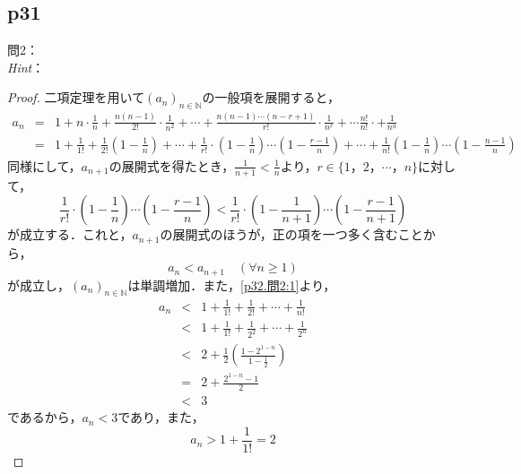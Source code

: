 \documentclass[dvipdfmx,uplatex,11pt]{jsarticle}
\begin{document}
\subsection{p31}
\noindent
問2：
\\
\textsl{Hint}：\\
\dotfill
\begin{leftbar}
	\begin{proof}
		二項定理を用いて$(a_n)_{n \in \mathbb{N}}$の一般項を展開すると，
		\begin{eqnarray}
			a_n & = & 1 + n \cdot \frac{1}{n} + \frac{n(n-1)}{2!} \cdot \frac{1}{n^2} + \cdots + \frac{n(n-1)\cdots(n-r+1)}{r!} \cdot \frac{1}{n^r} + \cdots \frac{n!}{n!} \cdot + \frac{1}{n^n} \nonumber  \\
			& = & 1+ \frac{1}{1!} + \frac{1}{2!} \left(1- \frac{1}{n} \right) + \cdots + \frac{1}{r!} \cdot  \left(1 - \frac{1}{n} \right) \cdots \left (1-\frac{r-1}{n} \right) + \cdots \nonumber +  \frac{1}{n!} \left(1 - \frac{1}{n} \right) \cdots \left(1- \frac{n-1}{n} \right) \label{p32.問2:1}
		\end{eqnarray}
		同様にして，$a_{n+1}$の展開式を得たとき，$ \frac{1}{n+1} < \frac{1}{n}$より，$r\in \{ 1，2，\cdots ，n\}$に対して，
		\begin{equation}
			\frac{1}{r!} \cdot  \left(1 - \frac{1}{n} \right) \cdots \left (1-\frac{r-1}{n} \right) < \frac{1}{r!} \cdot  \left(1 - \frac{1}{n+1} \right) \cdots \left (1-\frac{r-1}{n+1} \right)
		\end{equation}
		が成立する．これと，$a_{n+1}$の展開式のほうが，正の項を一つ多く含むことから，
		\begin{equation}
			a_{n} < a_{n+1} \quad (\forall n \ge 1)
		\end{equation}
		が成立し，$(a_n)_{n \in \mathbb{N}}$は単調増加．また，\eqref{p32.問2:1}より，
		\begin{eqnarray}
			\label{p32.問2:2}
			a_n &<& 1 + \frac{1}{1!} + \frac{1}{2!} + \cdots + \frac{1}{n!} \\
			& < & 1 + \frac{1}{1!} + \frac{1}{2^2} + \cdots + \frac{1}{2^n} \\
			& < & 2 + \frac{1}{2} \left( \frac{ 1 - 2^{1-n} }{ 1- \frac{1}{2} } \right)\\
			& = & 2+ \frac{2^{1-n} -1}{2} \\
			\label{p32.問2:3}
			& < & 3
		\end{eqnarray}
		であるから，$a_n < 3$であり，また，
		\begin{equation}
			\label{p32.問2:4}
			a_n > 1 + \frac{1}{1!} =2
		\end{equation}

\end{proof}
\end{leftbar}
\end{document}

